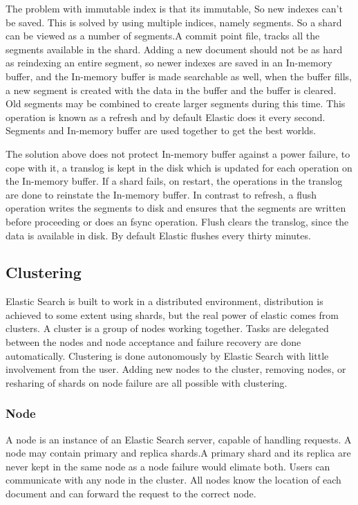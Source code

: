 \documentclass[12pt]{article}
\begin{document}
				The problem with immutable index is that its immutable, So new indexes can't be saved. This is solved by using multiple indices, namely segments. So a shard can be viewed as a number of segments.A commit point file, tracks all the segments available in the shard. Adding a new document should not be as hard as reindexing an entire segment, so newer indexes are saved in an In-memory buffer, and the In-memory buffer is made searchable as well, when the buffer fills, a new segment is created with the data in the buffer and the buffer is cleared. Old segments may be combined to create larger segments during this time. This operation is known as a refresh and by default Elastic does it every second. Segments and In-memory buffer are used together to get the best worlds.

				The solution above does not protect In-memory buffer against a power failure, to cope with it, a translog is kept in the disk which is updated for each operation on the In-memory buffer. If a shard fails, on restart, the operations in the translog are done to reinstate the In-memory buffer. In contrast to refresh, a flush operation writes the segments to disk and ensures that the segments are written before proceeding or does an fsync operation. Flush clears the translog, since the data is available in disk. By default Elastic flushes every thirty minutes.

		\subsection{Clustering}
			Elastic Search is built to work in a distributed environment, distribution is achieved to some extent using shards, but the real power of elastic comes from clusters. A cluster is a group of nodes working together. Tasks are delegated between the nodes and node acceptance and failure recovery are done automatically. Clustering is done autonomously by Elastic Search with little involvement from the user. Adding new nodes to the cluster, removing nodes, or resharing of shards on node failure are all possible with clustering.

			\subsubsection{Node}
				A node is an instance of an Elastic Search server, capable of handling requests. A node may contain primary and replica shards.A primary shard and its replica are never kept in the same node as a node failure would elimate both. Users can communicate with any node in the cluster. All nodes know the location of each document and can forward the request to the correct node.\cite{ijsr}
\end{document}

